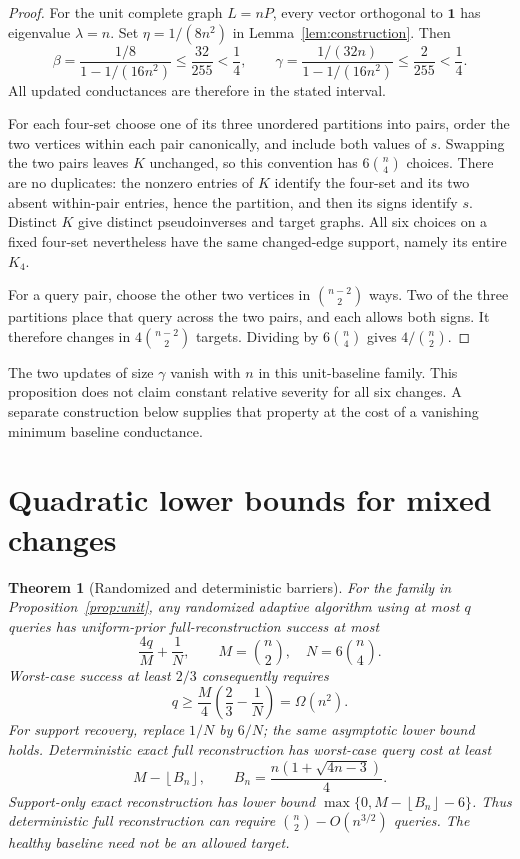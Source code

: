 \documentclass[11pt,letterpaper]{article}
\newtheorem{theorem}{Theorem}
\newcommand{\one}{\mathbf 1}
\newcommand{\floor}[1]{\left\lfloor #1\right\rfloor}
\begin{document}
\begin{proof}
For the unit complete graph $L=nP$, every vector orthogonal to $\one$ has eigenvalue $\lambda=n$. Set $\eta=1/(8n^2)$ in Lemma~\ref{lem:construction}. Then
\[
 \beta=\frac{1/8}{1-1/(16n^2)}\le\frac{32}{255}<\frac14,\qquad
 \gamma=\frac{1/(32n)}{1-1/(16n^2)}\le\frac{2}{255}<\frac14.
\]
All updated conductances are therefore in the stated interval.

For each four-set choose one of its three unordered partitions into pairs, order the two vertices within each pair canonically, and include both values of $s$. Swapping the two pairs leaves $K$ unchanged, so this convention has $6\binom n4$ choices. There are no duplicates: the nonzero entries of $K$ identify the four-set and its two absent within-pair entries, hence the partition, and then its signs identify $s$. Distinct $K$ give distinct pseudoinverses and target graphs. All six choices on a fixed four-set nevertheless have the same changed-edge support, namely its entire $K_4$.

For a query pair, choose the other two vertices in $\binom{n-2}2$ ways. Two of the three partitions place that query across the two pairs, and each allows both signs. It therefore changes in $4\binom{n-2}2$ targets. Dividing by $6\binom n4$ gives $4/\binom n2$.
\end{proof}

The two updates of size $\gamma$ vanish with $n$ in this unit-baseline family. This proposition does not claim constant relative severity for all six changes. A separate construction below supplies that property at the cost of a vanishing minimum baseline conductance.

\section{Quadratic lower bounds for mixed changes}
\begin{theorem}[Randomized and deterministic barriers]\label{thm:lower}
For the family in Proposition~\ref{prop:unit}, any randomized adaptive algorithm using at most $q$ queries has uniform-prior full-reconstruction success at most
\[
 \frac{4q}{M}+\frac1N,\qquad M=\binom n2,\quad N=6\binom n4.
\]
Worst-case success at least $2/3$ consequently requires
\[
 q\ge\frac{M}{4}\left(\frac23-\frac1N\right)=\Omega(n^2).
\]
For support recovery, replace $1/N$ by $6/N$; the same asymptotic lower bound holds. Deterministic exact full reconstruction has worst-case query cost at least
\[
 M-\floor{B_n},\qquad B_n=\frac{n(1+\sqrt{4n-3})}{4}.
\]
Support-only exact reconstruction has lower bound $\max\{0,M-\floor{B_n}-6\}$. Thus deterministic full reconstruction can require $\binom n2-O(n^{3/2})$ queries. The healthy baseline need not be an allowed target.
\end{theorem}
\end{document}
